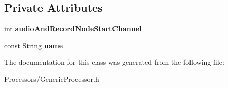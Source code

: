 \subsection*{Private Attributes}
\begin{DoxyCompactItemize}
\item 
\hypertarget{classGenericProcessor_a940419f6cc9ce107f55d7b1a167341d1}{int {\bfseries audio\-And\-Record\-Node\-Start\-Channel}}\label{classGenericProcessor_a940419f6cc9ce107f55d7b1a167341d1}

\item 
\hypertarget{classGenericProcessor_a1491a414e1158d269bc3fd5fb58282e5}{const String {\bfseries name}}\label{classGenericProcessor_a1491a414e1158d269bc3fd5fb58282e5}

\end{DoxyCompactItemize}


The documentation for this class was generated from the following file\-:\begin{DoxyCompactItemize}
\item 
Processors/Generic\-Processor.\-h\end{DoxyCompactItemize}
